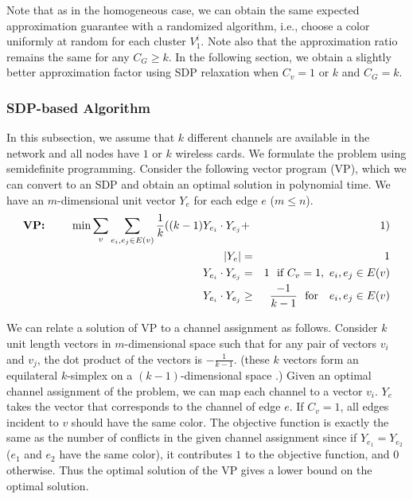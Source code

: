 \documentclass[titlepage, 11pt]{article}
\begin{document}
Note that as in the homogeneous case, 
we can obtain the same expected approximation guarantee with a randomized algorithm, 
i.e., choose a color uniformly at random for each cluster $V_1^i$.
Note also that the approximation ratio remains the same for any $C_G \ge k$.
In the following section, we obtain a slightly better approximation factor 
using SDP relaxation  when $C_v = 1$ or $k$ and $C_G = k$.

\subsubsection{SDP-based Algorithm}
\label{sec:sdp}

In this subsection, we assume that $k$ different channels are
available in the network and all nodes have $1$ or $k$ wireless cards.  We formulate the problem using semidefinite programming.
Consider the following vector program (VP), which we can  
convert to an SDP and obtain an optimal solution in polynomial time. 
We have an $m$-dimensional unit vector $Y_e$ for each edge $e$ ($m \le n$).
\begin{eqnarray}
\mbox{\bf VP:~~~~~~}
\min  \sum_v \sum_{e_i, e_j \in E(v)} \frac{1}{k}((k-1) Y_{e_i} \cdot Y_{e_j}& +& 1)
\label{eqn:obj}\\
|Y_e| &= & 1 \label{eqn:edge} \\
Y_{e_i} \cdot Y_{e_j} &=& 1  ~~ \mbox{if~} C_v = 1 \label{eqn:color1}, ~e_i, e_j \in E(v) \\
Y_{e_i} \cdot Y_{e_j} &\ge& \frac{-1}{k-1}  ~~ \mbox{for ~}  ~e_i, e_j \in E(v) 
\end{eqnarray}

We can relate a solution of VP to a channel assignment as follows.
Consider $k$ unit length vectors in $m$-dimensional space such 
that for any pair of vectors $v_i$ and $v_j$, 
the dot product of the vectors is $- \frac{1}{k-1}$.
(these $k$ vectors form an equilateral $k$-simplex on a $(k-1)$-dimensional space
\cite{kcut,kms94}.)
Given an optimal channel assignment of the problem,
we can map each channel to a vector $v_i$.
$Y_e$ takes the vector that corresponds to the channel of edge $e$.
If $C_v = 1$, all edges incident to $v$ should have the same color.
The objective function is exactly the same as the number of 
conflicts in the given channel assignment
since if $Y_{e_1} = Y_{e_2}$ ($e_1$ and $e_2$ have the same color),
it contributes $1$ to the objective function, and 0 otherwise.
Thus the optimal solution of the VP gives a lower bound on the optimal solution.
\end{document}
